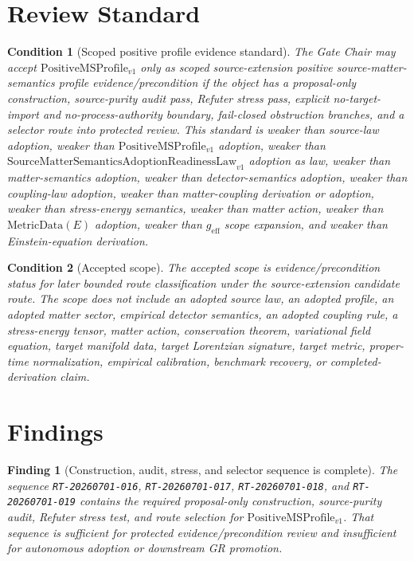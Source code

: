 \documentclass[11pt]{article}
\newcommand{\PositiveMSProfile}{\mathrm{PositiveMSProfile}_{v1}}
\newcommand{\SMSAR}{\mathrm{SourceMatterSemanticsAdoptionReadinessLaw}_{v1}}
\newcommand{\MetricData}{\mathrm{MetricData}}
\newcommand{\geff}{g_{\mathrm{eff}}}
\newtheorem{finding}{Finding}
\newtheorem{condition}{Condition}
\begin{document}
\section{Review Standard}

\begin{condition}[Scoped positive profile evidence standard]
The Gate Chair may accept \(\PositiveMSProfile\) only as scoped
source-extension positive source-matter-semantics profile evidence/precondition
if the object has a proposal-only construction, source-purity audit pass,
Refuter stress pass, explicit no-target-import and no-process-authority
boundary, fail-closed obstruction branches, and a selector route into protected
review. This standard is weaker than source-law adoption, weaker than
\(\PositiveMSProfile\) adoption, weaker than \(\SMSAR\) adoption as law,
weaker than matter-semantics adoption, weaker than detector-semantics
adoption, weaker than coupling-law adoption, weaker than matter-coupling
derivation or adoption, weaker than stress-energy semantics, weaker than
matter action, weaker than \(\MetricData(E)\) adoption, weaker than \(\geff\)
scope expansion, and weaker than Einstein-equation derivation.
\end{condition}

\begin{condition}[Accepted scope]
The accepted scope is evidence/precondition status for later bounded route
classification under the source-extension candidate route. The scope does not
include an adopted source law, an adopted profile, an adopted matter sector,
empirical detector semantics, an adopted coupling rule, a stress-energy
tensor, matter action, conservation theorem, variational field equation,
target manifold data, target Lorentzian signature, target metric, proper-time
normalization, empirical calibration, benchmark recovery, or
completed-derivation claim.
\end{condition}

\section{Findings}

\begin{finding}[Construction, audit, stress, and selector sequence is complete]
The sequence \texttt{RT-20260701-016}, \texttt{RT-20260701-017},
\texttt{RT-20260701-018}, and \texttt{RT-20260701-019} contains the required
proposal-only construction, source-purity audit, Refuter stress test, and
route selection for \(\PositiveMSProfile\). That sequence is sufficient for
protected evidence/precondition review and insufficient for autonomous
adoption or downstream GR promotion.
\end{finding}
\end{document}
